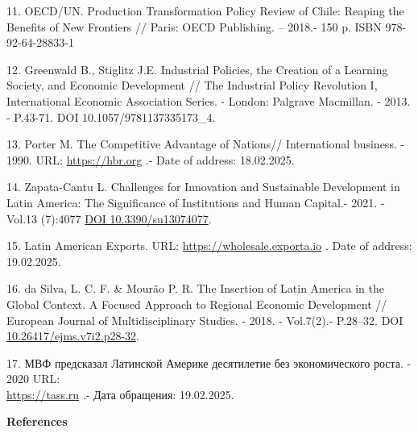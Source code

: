 \begin{references}
11. OECD/UN. Production Transformation Policy Review of Chile: Reaping
the Benefits of New Frontiers // Paris: OECD Publishing. -- 2018.- 150
p. ISBN 978-92-64-28833-1

12. Greenwald B., Stiglitz J.E. Industrial Policies, the Creation of a
Learning Society, and Economic Development // The Industrial Policy
Revolution I, International Economic Association Series. - London:
Palgrave Macmillan. - 2013. - P.43-71. DOI 10.1057/9781137335173\_4.

13. Porter M. The Competitive Advantage of Nations// International
business. - 1990. URL:
\href{https://hbr.org/1990/03/the-competitive-advantage-of-nations}{https://hbr.org} .-
Date of address: 18.02.2025.

14. Zapata-Cantu L. Challenges for Innovation and Sustainable Development
in Latin America: The Signi\-ficance of Institutions and Human Capital.-
2021. -Vol.13 (7):4077
\href{https://doi.org/10.3390/su13074077}{DOI 10.3390/su13074077}.

15. Latin American Exports. URL:
\href{https://wholesale.exporta.io/blog/latin-american-exports}{https://wholesale.exporta.io} . Date of
address: 19.02.2025.

16. da Silva, L. C. F. \& Mourão P. R. The Insertion of Latin America in
the Global Context. A Focused Approach to Regional Economic Development
// European Journal of Multidisciplinary Studies. - 2018. - Vol.7(2).-
P.28--32. DOI
\href{http://dx.doi.org/10.26417/ejms.v7i2.p28-32}{10.26417/ejms.v7i2.p28-32}.

17. МВФ предсказал Латинской Америке десятилетие без экономического
роста. - 2020 URL: \\\href{https://tass.ru/ekonomika/8266077}{https://tass.ru} .- Дата
обращения: 19.02.2025.
\end{references}

\begin{center}
{\bfseries References}
\end{center}


